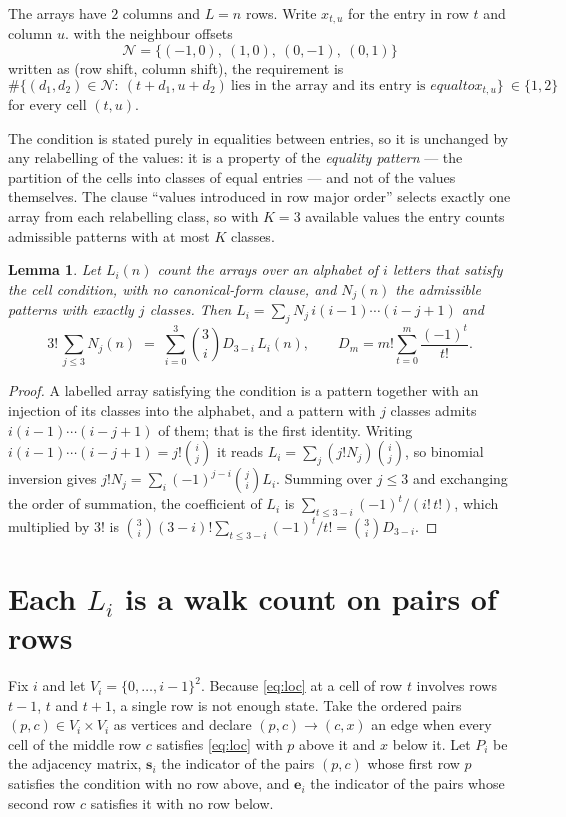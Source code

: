 \documentclass[11pt,a4paper]{article}
\theoremstyle{plain}
\newtheorem{lemma}[theorem]{Lemma}
\theoremstyle{definition}
\begin{document}
The arrays have $2$ columns and $L=n$ rows. Write $x_{t,u}$ for the entry in
row $t$ and column $u$. with the neighbour offsets
\[
\mathcal N=\{(-1,0),\ (1,0),\ (0,-1),\ (0,1)\}
\]
written as (row shift, column shift), the requirement is
\begin{equation}\label{eq:loc}
\#\bigl\{(d_1,d_2)\in\mathcal N:\ (t+d_1,u+d_2)\ \text{lies in the array and its entry is }
equal to x_{t,u}\bigr\}\ \in\{1,2\}
\end{equation}
for every cell $(t,u)$.

The condition is stated purely in equalities between entries, so it is unchanged by any
relabelling of the values: it is a property of the \emph{equality pattern} --- the partition
of the cells into classes of equal entries --- and not of the values themselves. The clause
``values introduced in row major order'' selects exactly one array from each relabelling
class, so with $K=3$ available values the entry counts admissible patterns with at most $K$
classes.

\begin{lemma}\label{lem:inv}
Let $L_i(n)$ count the arrays over an alphabet of $i$ letters that satisfy the cell
condition, with no canonical-form clause, and $N_j(n)$ the admissible patterns with exactly
$j$ classes. Then $L_i=\sum_j N_j\,i(i-1)\cdots(i-j+1)$ and
\[
3!\,\sum_{j\le 3}N_j(n)\;=\;\sum_{i=0}^{3}\binom{3}{i}D_{3-i}\,L_i(n),
\qquad D_m=m!\sum_{t=0}^{m}\frac{(-1)^t}{t!} .
\]
\end{lemma}

\begin{proof}
A labelled array satisfying the condition is a pattern together with an injection of its
classes into the alphabet, and a pattern with $j$ classes admits $i(i-1)\cdots(i-j+1)$ of
them; that is the first identity. Writing $i(i-1)\cdots(i-j+1)=j!\binom{i}{j}$ it reads
$L_i=\sum_j(j!N_j)\binom{i}{j}$, so binomial inversion gives
$j!N_j=\sum_i(-1)^{j-i}\binom{j}{i}L_i$. Summing over $j\le3$ and exchanging the
order of summation, the coefficient of $L_i$ is
$\sum_{t\le3-i}(-1)^t/(i!\,t!)$, which multiplied by $3!$ is
$\binom{3}{i}(3-i)!\sum_{t\le3-i}(-1)^t/t!=\binom{3}{i}D_{3-i}$.
\end{proof}

\section{Each $L_i$ is a walk count on pairs of rows}

Fix $i$ and let $V_i=\{0,\dots,i-1\}^{2}$. Because \eqref{eq:loc} at a cell of row
$t$ involves rows $t-1$, $t$ and $t+1$, a single row is not enough state. Take the
ordered pairs $(p,c)\in V_i\times V_i$ as vertices and declare $(p,c)\to(c,x)$ an edge when
every cell of the middle row $c$ satisfies \eqref{eq:loc} with $p$ above it and $x$
below it. Let $P_i$ be the adjacency matrix, $\mathbf{s}_i$ the indicator of the pairs
$(p,c)$ whose first row $p$ satisfies the condition with no row above, and
$\mathbf{e}_i$ the indicator of the pairs whose second row $c$ satisfies it with no
row below.
\end{document}
